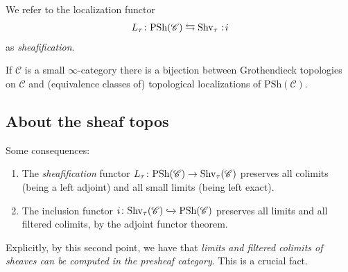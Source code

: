\documentclass[11pt]{amsart}
\renewcommand{\Pre}{\mathrm{PSh}}
\begin{document}
\begin{terminology} We refer to the localization functor
\begin{align*}
    L_\tau \colon \Pre(\mathscr{C}) \leftrightarrows \Shv_\tau \noloc i
\end{align*}
as \textit{sheafification}.
\end{terminology}

\begin{proposition} \cite[6.2.2.17]{HTT} If $\mathscr{C}$ is a small $\infty$-category there is a bijection between Grothendieck topologies on $\mathscr{C}$ and (equivalence classes of) topological localizations of $\Pre(\mathscr{C})$.
\end{proposition}

\subsection{About the sheaf topos}

\begin{corollary}\label{cor:properties-sheafification} 
Some consequences:
\begin{enumerate}
    \item The \textit{sheafification} functor $L_\tau \colon \Pre(\mathscr{C}) \to \Shv_\tau(\mathscr{C})$ preserves all colimits (being a left adjoint) and all small limits (being left exact).

    \item The inclusion functor $i \colon \Shv_\tau(\mathscr{C}) \hookto \Pre(\mathscr{C})$ preserves all limits and all filtered colimits, by the adjoint functor theorem.
\end{enumerate}
\end{corollary}

Explicitly, by this second point, we have that \textit{limits and filtered colimits of sheaves can be computed in the presheaf category}. This is a crucial fact.
\end{document}
